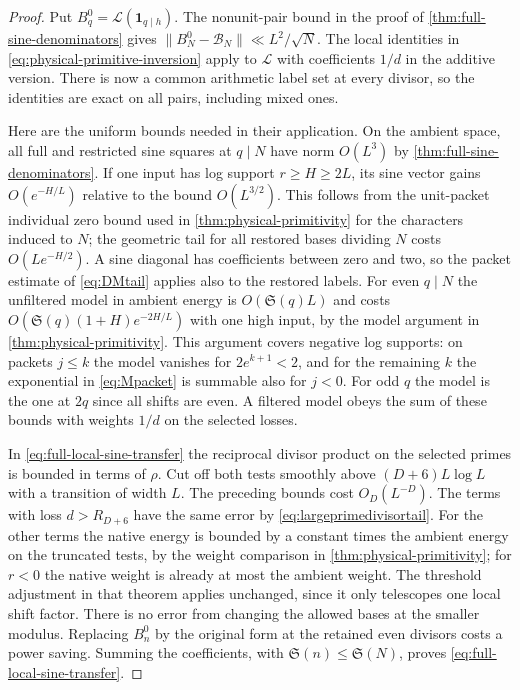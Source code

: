 \documentclass[11pt,a4paper]{article}
\numberwithin{equation}{section}
\newcommand{\SSS}{\mathfrak S}
\newcommand{\B}{\mathcal B_N}
\begin{document}
\begin{proof}
Put $B_q^0=\mathcal L(\mathbf1_{q\mid h})$. The nonunit-pair
bound in the proof of \cref{thm:full-sine-denominators} gives
$\|B_N^0-\B\|\ll L^2/\sqrt N$. The local
identities in \eqref{eq:physical-primitive-inversion} apply to
$\mathcal L$ with coefficients $1/d$ in the additive version.
There is now a common arithmetic label set at every divisor,
so the identities are exact on all pairs, including mixed ones.

Here are the uniform bounds needed in their application. On the
ambient space, all full and restricted sine squares at $q\mid N$
have norm $O(L^3)$ by \cref{thm:full-sine-denominators}. If one
input has log support $r\ge H\ge2L$, its sine vector gains
$O(e^{-H/L})$ relative to the bound $O(L^{3/2})$. This follows
from the unit-packet individual zero bound used in
\cref{thm:physical-primitivity} for the characters induced to $N$;
the geometric tail for all restored bases dividing $N$ costs
$O(Le^{-H/2})$. A sine diagonal has coefficients between zero
and two, so the packet estimate of \cref{eq:DMtail} applies also
to the restored labels. For even $q\mid N$ the unfiltered model
in ambient energy is $O(\SSS(q)L)$ and costs
$O(\SSS(q)(1+H)e^{-2H/L})$ with one high input, by the model
argument in \cref{thm:physical-primitivity}. This argument covers
negative log supports: on packets $j\le k$ the model vanishes
for $2e^{k+1}<2$, and for the remaining $k$ the exponential
in \eqref{eq:Mpacket} is summable also for $j<0$. For odd $q$
the model is the one at $2q$ since all shifts are even. A
filtered model obeys the sum of these bounds with weights $1/d$
on the selected losses.

In \eqref{eq:full-local-sine-transfer} the reciprocal divisor
product on the selected primes is bounded in terms of $\rho$.
Cut off both tests smoothly above $(D+6)L\log L$ with a
transition of width $L$. The preceding bounds cost $O_D(L^{-D})$.
The terms with loss $d>R_{D+6}$ have the same error by
\eqref{eq:largeprimedivisortail}. For the other terms the native
energy is bounded by a constant times the ambient energy on the
truncated tests, by the weight comparison in
\cref{thm:physical-primitivity}; for $r<0$ the native weight is
already at most the ambient weight. The threshold adjustment
in that theorem applies unchanged, since it only telescopes
one local shift factor. There is no error from changing the
allowed bases at the smaller modulus. Replacing $B_n^0$ by the
original form at the retained even divisors costs a power saving.
Summing the coefficients, with $\SSS(n)\le\SSS(N)$, proves
\eqref{eq:full-local-sine-transfer}.


\end{proof}
\end{document}
